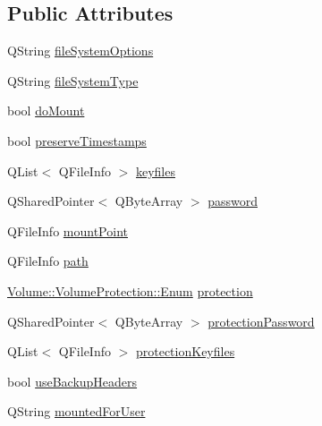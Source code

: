 \subsection*{Public Attributes}
\begin{DoxyCompactItemize}
\item 
Q\+String \hyperlink{struct_gost_crypt_1_1_core_1_1_mount_volume_request_aae99596107c8aec7b44f91f0f7bf4525}{file\+System\+Options}
\item 
Q\+String \hyperlink{struct_gost_crypt_1_1_core_1_1_mount_volume_request_ab35801e361af1509638f47ec6117d5ac}{file\+System\+Type}
\item 
bool \hyperlink{struct_gost_crypt_1_1_core_1_1_mount_volume_request_a9e33a3e0ce0c4c9df8b4f6feeb63f576}{do\+Mount}
\item 
bool \hyperlink{struct_gost_crypt_1_1_core_1_1_mount_volume_request_a0f08676348d29ec9c93a2303ddbbcdef}{preserve\+Timestamps}
\item 
Q\+List$<$ Q\+File\+Info $>$ \hyperlink{struct_gost_crypt_1_1_core_1_1_mount_volume_request_ab18918435d55773483cb8ec0be1d7f09}{keyfiles}
\item 
Q\+Shared\+Pointer$<$ Q\+Byte\+Array $>$ \hyperlink{struct_gost_crypt_1_1_core_1_1_mount_volume_request_ae1920191de61d1f8224793f85b49e05b}{password}
\item 
Q\+File\+Info \hyperlink{struct_gost_crypt_1_1_core_1_1_mount_volume_request_a4ed6d34a588a845b15f11074c5302a76}{mount\+Point}
\item 
Q\+File\+Info \hyperlink{struct_gost_crypt_1_1_core_1_1_mount_volume_request_a5591ca5a667d67241c1d696d7fa23b7c}{path}
\item 
\hyperlink{struct_gost_crypt_1_1_volume_1_1_volume_protection_a8dd7301af256c893dc1e0a08c7530c7f}{Volume\+::\+Volume\+Protection\+::\+Enum} \hyperlink{struct_gost_crypt_1_1_core_1_1_mount_volume_request_ac9110493ad5f1353e46dc59751487d43}{protection}
\item 
Q\+Shared\+Pointer$<$ Q\+Byte\+Array $>$ \hyperlink{struct_gost_crypt_1_1_core_1_1_mount_volume_request_a038390b2cbc49aecca10eb0b96cb998f}{protection\+Password}
\item 
Q\+List$<$ Q\+File\+Info $>$ \hyperlink{struct_gost_crypt_1_1_core_1_1_mount_volume_request_adba597763cbd436a01a6078cbfa8ac9c}{protection\+Keyfiles}
\item 
bool \hyperlink{struct_gost_crypt_1_1_core_1_1_mount_volume_request_a0b0879ac3e44a8ae73f03f041a278cb5}{use\+Backup\+Headers}
\item 
Q\+String \hyperlink{struct_gost_crypt_1_1_core_1_1_mount_volume_request_a01b3f0045317668cd4cf66fca458603c}{mounted\+For\+User}

\end{DoxyCompactItemize}
